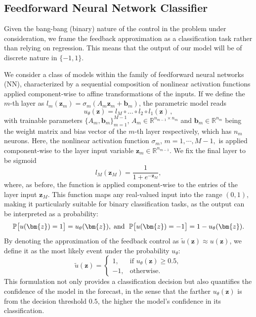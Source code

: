 \documentclass[11pt]{amsart}
\theoremstyle{definition}
\theoremstyle{remark}
\numberwithin{equation}{section}
\begin{document}
\subsection{Feedforward Neural Network Classifier}
 Given the bang-bang (binary) nature of the control in the problem under consideration, we frame the feedback approximation as a classification task rather than relying on regression. This means that the output of our model will be of discrete nature in $\{-1,1\}$. 
 
 We consider a class of models within the family of feedforward neural networks (NN), characterized by a sequential composition of nonlinear activation functions applied component-wise to affine transformations of the inputs. 
 If we define the $m$-th layer as $l_m(\bm{z}_m)=\sigma_m\left(A_m \bm{z}_m+\bm b_m\right)$, the parametric model reads
 \begin{equation*}
 u_\theta(\bm{z}) = l_M \circ \ldots \circ l_2 \circ l_1(\bm{z})\,,
 \end{equation*}
 with trainable parameters $\{A_m,\bm b_m\}_{m=1}^{M-1}$, $A_m\in\mathbb{R}^{n_{m-1}\times n_m}$ and $\bm b_m\in\mathbb{R}^{n_m}$ being the weight matrix and bias vector of the $m$-th layer respectively, which has $n_m$ neurons. Here, the nonlinear activation function $\sigma_m$, $m=1,\cdots,M-1,$ is applied component-wise to the layer input variable $\bm{z}_m\in\mathbb{R}^{n_{m-1}}$. We fix the final layer to be sigmoid 
 \begin{equation*}
 l_M(\bm{z}_M) = \dfrac{1}{1 + e^{-\bm{z}_M}},
 \end{equation*}
 where, as before, the function is applied component-wise to the entries of the layer input $\bm{z}_M$. This function maps any real-valued input into the range $(0,1)$, making it particularly suitable for binary classification tasks, as the output can be interpreted as a probability:
\begin{equation}\label{net_prob}
\mathbb{P}\big[u(\bm{z})=1\big] = u_\theta (\bm{z}), \;\text{and\; }\mathbb{P}\big[u(\bm{z})=-1\big] =1 - u_\theta (\bm{z}).
\end{equation}
 By denoting the approximation of the feedback control as $\tilde{u}(\bm{z})\approx u(\bm{z})$, we define it as the most likely event under the probability $u_\theta$:
\begin{equation*}
\tilde{u}(\bm{z}) = 
\begin{cases} 
1, & \text{if } u_\theta(\bm{z}) \geq 0.5, \\
-1, & \text{otherwise}.
\end{cases}
\end{equation*}
This formulation not only provides a classification decision but also quantifies the confidence of the model in the forecast, in the sense that the farther \(u_\theta(\bm{z})\) is from the decision threshold \(0.5\), the higher the model’s confidence in its classification.
 
\end{document}
